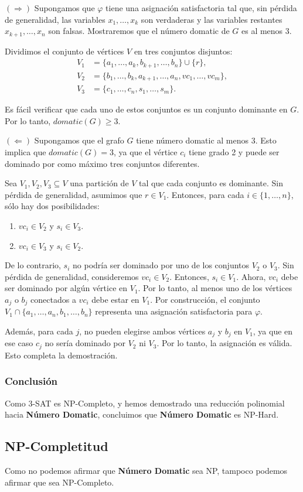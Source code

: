 \documentclass[a4paper,12pt]{article}
\begin{document}
$(\Rightarrow)$ Supongamos que $\varphi$ tiene una asignación satisfactoria tal que, sin pérdida de generalidad, las variables $x_1, \dots, x_k$ son verdaderas y las variables restantes $x_{k+1}, \dots, x_n$ son falsas. Mostraremos que el número domatic de $G$ es al menos 3.

Dividimos el conjunto de vértices $V$ en tres conjuntos disjuntos:
\begin{align*}
    V_1 &= \{a_1, \dots, a_k, b_{k+1}, \dots, b_n\} \cup \{r\}, \\
    V_2 &= \{b_1, \dots, b_k, a_{k+1}, \dots, a_n, vc_1, \dots, vc_m\}, \\
    V_3 &= \{c_1, \dots, c_n, s_1, \dots, s_m\}.
\end{align*}

Es fácil verificar que cada uno de estos conjuntos es un conjunto dominante en $G$. Por lo tanto, $domatic(G) \geq 3$.

$(\Leftarrow)$ Supongamos que el grafo $G$ tiene número domatic al menos 3. Esto implica que $domatic(G) = 3$, ya que el vértice $c_i$ tiene grado 2 y puede ser dominado por como máximo tres conjuntos diferentes.

Sea $V_1, V_2, V_3 \subseteq V$ una partición de $V$ tal que cada conjunto es dominante. Sin pérdida de generalidad, asumimos que $r \in V_1$. Entonces, para cada $i \in \{1, \dots, n\}$, sólo hay dos posibilidades:
\begin{enumerate}
    \item $vc_i \in V_2$ y $s_i \in V_3$.
    \item $vc_i \in V_3$ y $s_i \in V_2$.
\end{enumerate}

De lo contrario, $s_i$ no podría ser dominado por uno de los conjuntos $V_2$ o $V_3$. Sin pérdida de generalidad, consideremos $vc_i \in V_2$. Entonces, $s_i \in V_1$. Ahora, $vc_i$ debe ser dominado por algún vértice en $V_1$. Por lo tanto, al menos uno de los vértices $a_j$ o $b_j$ conectados a $vc_i$ debe estar en $V_1$. Por construcción, el conjunto $V_1 \cap \{a_1, \dots, a_n, b_1, \dots, b_n\}$ representa una asignación satisfactoria para $\varphi$.

Además, para cada $j$, no pueden elegirse ambos vértices $a_j$ y $b_j$ en $V_1$, ya que en ese caso $c_j$ no sería dominado por $V_2$ ni $V_3$. Por lo tanto, la asignación es válida. Esto completa la demostración.


\subsubsection{Conclusión}
Como \textsc{3-SAT} es NP-Completo, y hemos demostrado una reducción polinomial hacia \textbf{Número Domatic}, concluimos que \textbf{Número Domatic} es NP-Hard.

\subsection{NP-Completitud}

Como no podemos afirmar que \textbf{Número Domatic} sea NP, tampoco podemos afirmar que sea NP-Completo.
\end{document}
